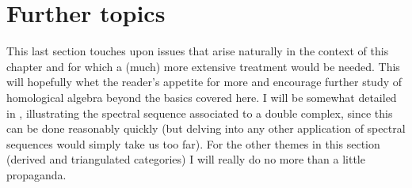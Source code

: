 \section{Further topics}
\label{sec:homol:further-topics}

This last section touches upon issues that arise naturally in the
context of this chapter and for which a (much) more extensive
treatment would be needed. This will hopefully whet the reader's
appetite for more and encourage further study of homological algebra
beyond the basics covered here. I will be somewhat detailed in
, illustrating the spectral
sequence associated to a double complex, since this can be done
reasonably quickly (but delving into any other application of spectral
sequences would simply take us too far). For the other themes in this
section (derived and triangulated categories) I will really do no more
than a little propaganda.

